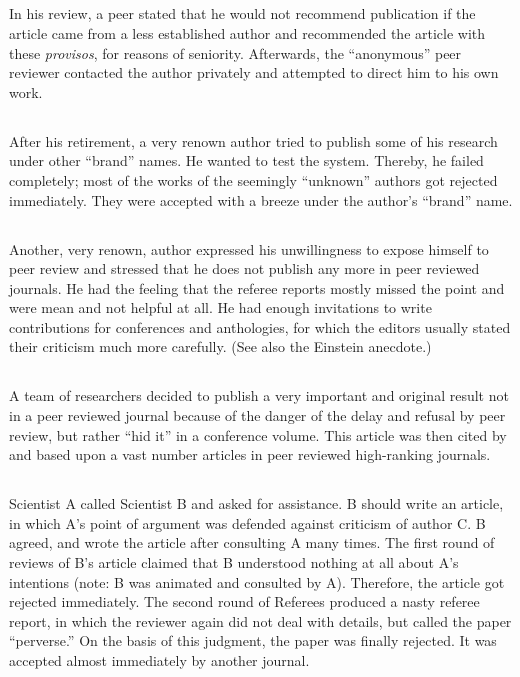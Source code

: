 \subsection{} In his review, a peer stated that he would not recommend
 publication if the article came from a less established author and
recommended the article with these {\it provisos}, for reasons of seniority.
Afterwards, the ``anonymous'' peer reviewer contacted the author
privately and attempted to direct him to his own work.


\subsection{} After his retirement, a very renown author tried to
publish some of his research under other ``brand'' names.  He wanted to test
the system.  Thereby, he failed completely; most of the works of the
seemingly ``unknown'' authors got rejected immediately.  They were
accepted with a breeze under the author's ``brand'' name.


\subsection{} Another, very renown, author expressed his unwillingness
to expose himself to peer review and stressed that he does not publish
any more in peer reviewed journals.  He had the feeling that the referee
reports mostly missed the point and were mean and not helpful at all.  He had
enough invitations to write contributions for conferences and
anthologies, for which the editors usually stated their criticism much
more carefully.  (See also the Einstein anecdote.)


\subsection{} A team of researchers decided to publish a very important
and original result not in a peer reviewed journal because of the
danger of the delay and refusal by peer review, but rather ``hid it'' in
a conference volume.  This article was then cited by and based upon a
vast number articles in peer reviewed high-ranking journals.


\subsection{} Scientist A called Scientist B and asked for assistance.
B should write an article, in which A's point of argument was defended
against criticism of author C. B agreed, and wrote the article after
consulting A many times.  The first round of reviews of B's article
claimed that B understood nothing at all about A's intentions
(note:  B was animated and consulted by A).  Therefore, the
article got rejected immediately.  The second round of Referees produced
a nasty referee report, in which the reviewer again did not deal with
details, but called the paper ``perverse.''  On the basis of this judgment,
the paper was finally rejected. It was accepted almost immediately by another journal.


